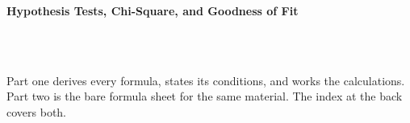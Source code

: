 



\makeindex[title={Index of This Volume},columns=2,intoc]

\begin{titlepage}\thispagestyle{empty}
\vspace*{0.14\textheight}
\noindent{\color{tiercore}\rule{\textwidth}{5pt}}\\[3pt]
\noindent{\color{bioline}\rule{\textwidth}{1pt}}\\[26pt]
\\[12pt]
\noindent\begin{minipage}{\textwidth}\raggedright
{\sffamily\bfseries\fontsize{28}{32}\selectfont\color{bioink}%
 \hyphenchar{} Hypothesis Tests, Chi-Square, and Goodness of Fit\par}\end{minipage}\\[16pt]
\noindent{\color{biogreen}\rule{\textwidth}{1.4pt}}\\[10pt]
\noindent\begin{minipage}{\textwidth}\raggedright
{\fontsize{10.5}{14}\selectfont\color{biogreen}%
Part one derives every formula, states its conditions, and works the calculations. Part two is the
bare formula sheet for the same material. The index at the back covers both.\par}\end{minipage}
\vfill
\noindent{\color{bioline}\rule{\textwidth}{1pt}}\\[3pt]
\noindent{\color{tiercore}\rule{\textwidth}{5pt}}
\end{titlepage}
\tableofcontents
\clearpage
{}
\clearpage
\printindex

